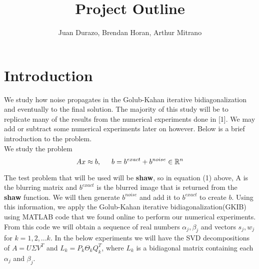 \documentclass[11pt]{amsart}
\title{Project Outline}
\author{Juan Durazo, Brendan Horan, Arthur Mitrano}
\begin{document}
\maketitle
\section{Introduction}
We study how noise propagates in the Golub-Kahan iterative bidiagonalization and eventually to the final solution. The majority of this study will be to replicate many of the results from the numerical experiments done in [1]. We may add or subtract some numerical experiments later on however. Below is a brief introduction to the problem.\\

We study the problem 
\begin{equation}
Ax\approx b, \indent  b=b^{exact} + b^{noise} \in \mathbb{R}^n
\end{equation}

The test problem that will be used will be {\bf shaw}, so in equation (1) above, A is the blurring matrix and $b^{exact}$ is the blurred image that is returned from the {\bf shaw} function. We will then generate $b^{noise}$ and add it to $b^{exact}$ to create $b$. Using this information, we apply the Golub-Kahan iterative bidiagonalization(GKIB) using MATLAB code that we found online to perform our numerical experiments. From this code we will obtain a sequence of real numbers $\alpha_j,\beta_j$ and vectors $s_j,w_j$ for $k=1,2,...k$. In the below experiments we will have the SVD decompositions of $A=U\Sigma V^T$ and $L_k = P_k\Theta_k Q_k^T$, where $L_k$ is a bidiagonal matrix containing each $\alpha_j$ and $\beta_j$.
\end{document}
